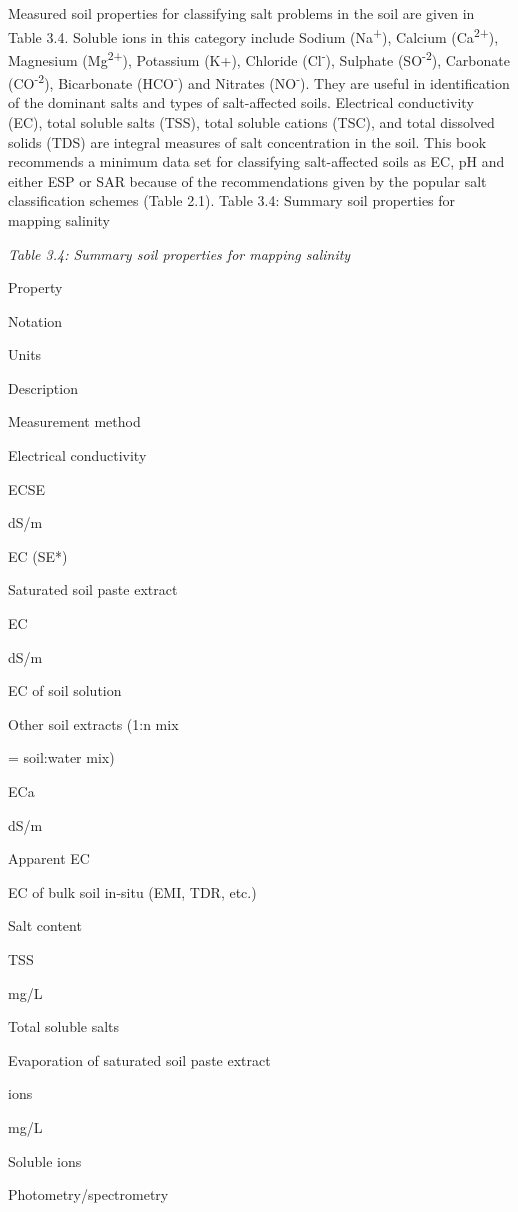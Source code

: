 \documentclass[
  10pt,
  b5paper,
]{book}
\begin{document}
Measured soil properties for classifying salt problems in the soil are given in Table 3.4. Soluble ions in this category include Sodium (Na\textsuperscript{+}), Calcium (Ca\textsuperscript{2+}), Magnesium (Mg\textsuperscript{2+}), Potassium (K+), Chloride (Cl\textsuperscript{-}), Sulphate (SO\textsuperscript{-2}), Carbonate (CO\textsuperscript{-2}), Bicarbonate (HCO\textsuperscript{-}) and Nitrates (NO\textsuperscript{-}). They are useful in identification of the dominant salts and types of salt-affected soils. Electrical conductivity (EC), total soluble salts (TSS), total soluble cations (TSC), and total dissolved solids (TDS) are integral measures of salt concentration in the soil. This book recommends a minimum data set for classifying salt-affected soils as EC, pH and either ESP or SAR because of the recommendations given by the popular salt classification schemes (Table 2.1).
Table 3.4: Summary soil properties for mapping salinity

\emph{Table 3.4: Summary soil properties for mapping salinity}

Property

Notation

Units

Description

Measurement method

Electrical conductivity

ECSE

dS/m

EC (SE*)

Saturated soil paste extract

EC

dS/m

EC of soil solution

Other soil extracts (1:n mix

= soil:water mix)

ECa

dS/m

Apparent EC

EC of bulk soil in-situ (EMI, TDR, etc.)

Salt content

TSS

mg/L

Total soluble salts

Evaporation of saturated soil paste extract

ions

mg/L

Soluble ions

Photometry/spectrometry
\end{document}
